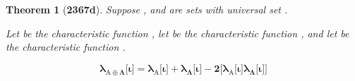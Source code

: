 \documentclass[preview]{standalone}
\newtheorem{theorem}{Theorem}
\begin{document}
\begin{theorem}[\textbf{2367d}]
    Suppose , and \bm{$\Lambda$} are sets with universal set \bm{$\Omega$}. 
    \begin{center}
        Let  be the characteristic function 
        ,
        let  be the characteristic function 
        , 
        and let \bm{$\lambda_{\Lambda}$} be the characteristic function  
        . 
    \end{center}
    \begin{equation*}
        \bm{
            \lambda_{\mathrm{A} \oplus \Lambda} \big[ \iota \big]
                = 
            \lambda_{\mathrm{A}} \big[ \iota \big] 
                + 
            \lambda_{\Lambda} \big[ \iota \big] 
                - 
            2 \Big[ \lambda_{\mathrm{A}} \big[ \iota \big] \lambda_{\Lambda} \big[ \iota \big] \Big]
        }
    \end{equation*}
\end{theorem}
\end{document}

